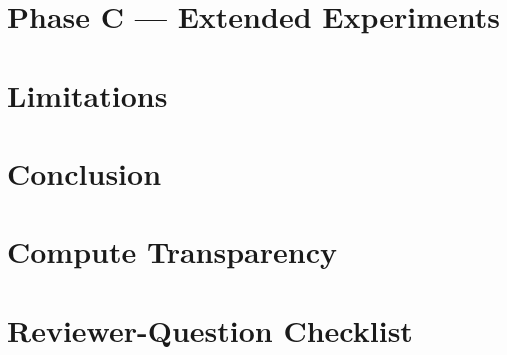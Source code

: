 \documentclass{article}
\begin{document}
\section{Phase C — Extended Experiments}
\label{sec:phasec}

\section{Limitations}
\label{sec:lim}

\section{Conclusion}
\label{sec:conc}

\appendix
\section{Compute Transparency}

\section{Reviewer-Question Checklist}



\end{document}
